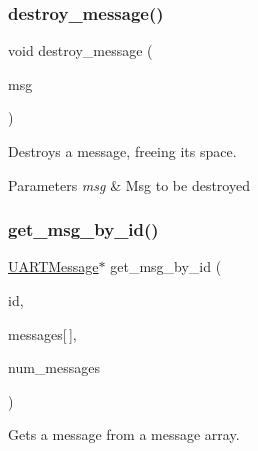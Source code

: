 \subsubsection{\texorpdfstring{destroy\+\_\+message()}{destroy\_message()}}
{\footnotesize\ttfamily void destroy\+\_\+message (\begin{DoxyParamCaption}\item[{\mbox{\hyperlink{struct_u_a_r_t_message}{U\+A\+R\+T\+Message}} $\ast$}]{msg }\end{DoxyParamCaption})}



Destroys a message, freeing its space. 


\begin{DoxyParams}{Parameters}
{\em msg} & Msg to be destroyed \\
\hline
\end{DoxyParams}
\mbox{\label{group__uart__protocol_gad448b41c7ab4a7e6ee93351e1475f829}} 
\subsubsection{\texorpdfstring{get\+\_\+msg\+\_\+by\+\_\+id()}{get\_msg\_by\_id()}}
{\footnotesize\ttfamily \mbox{\hyperlink{struct_u_a_r_t_message}{U\+A\+R\+T\+Message}}$\ast$ get\+\_\+msg\+\_\+by\+\_\+id (\begin{DoxyParamCaption}\item[{uint8\+\_\+t}]{id,  }\item[{\mbox{\hyperlink{struct_u_a_r_t_message}{U\+A\+R\+T\+Message}}}]{messages\mbox{[}$\,$\mbox{]},  }\item[{uint16\+\_\+t}]{num\+\_\+messages }\end{DoxyParamCaption})}



Gets a message from a message array. 


